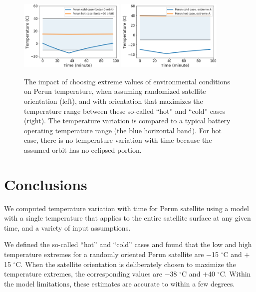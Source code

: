 \documentclass[]{aastex62}
\begin{document}
\begin{figure}[t!]
\centering
\includegraphics[width=0.45\textwidth, keepaspectratio]{figures/TempsPlot_Perun-hotVScold.png} 
\includegraphics[width=0.45\textwidth, keepaspectratio]{figures/TempsPlot_Perun-hotVScoldExtremeA.png} 

\caption{The impact of choosing extreme values of environmental conditions on Perun temperature,  
when assuming randomized satellite orientation (left), and with orientation that maximizes the temperature 
range between these so-called ``hot'' and ``cold'' cases (right). The temperature variation is compared to 
a typical battery operating temperature range (the blue horizontal band).  For hot case, there is no 
temperature variation with time because the assumed orbit has no eclipsed portion. 
\label{fig:SOCi1}}
\end{figure}



\section{Conclusions \label{sec:conclusions}} 

We computed temperature variation with time for Perun satellite using a model with a single 
temperature that applies to the entire satellite surface at any given time, and a variety of input 
assumptions. 
 
We defined the so-called ``hot'' and ``cold'' cases and found that the low and high temperature 
extremes for a randomly oriented Perun satellite are $-$15 $^\circ$C and $+$15 $^\circ$C. When the 
satellite orientation is deliberately chosen to maximize the temperature extremes, the corresponding 
values are $-$38 $^\circ$C and $+$40 $^\circ$C. 
Within the model limitations, these estimates are accurate to within a few degrees.  
\end{document}
